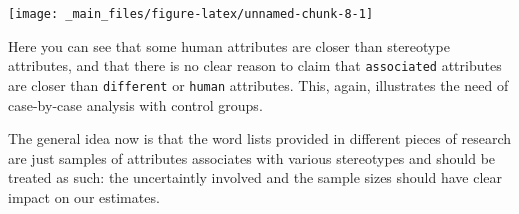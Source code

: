 \documentclass[12pt,]{book}
\newenvironment{Shaded}{\begin{snugshade}}{\end{snugshade}}
\newcommand{\KeywordTok}[1]{\textcolor[rgb]{0.13,0.29,0.53}{\textbf{#1}}}
\newcommand{\DecValTok}[1]{\textcolor[rgb]{0.00,0.00,0.81}{#1}}
\newcommand{\StringTok}[1]{\textcolor[rgb]{0.31,0.60,0.02}{#1}}
\newcommand{\CommentTok}[1]{\textcolor[rgb]{0.56,0.35,0.01}{\textit{#1}}}
\newcommand{\OperatorTok}[1]{\textcolor[rgb]{0.81,0.36,0.00}{\textbf{#1}}}
\newcommand{\NormalTok}[1]{#1}
\begin{document}
\vspace{1mm} \footnotesize

\begin{Shaded}
\end{Shaded}

\begin{center}\texttt{[image: \_main\_files/figure-latex/unnamed-chunk-8-1]} \end{center}

\normalsize

\noindent Here you can see that some human attributes are closer than
stereotype attributes, and that there is no clear reason to claim that
\texttt{associated} attributes are closer than \texttt{different} or
\texttt{human} attributes. This, again, illustrates the need of
case-by-case analysis with control groups.

The general idea now is that the word lists provided in different pieces
of research are just samples of attributes associates with various
stereotypes and should be treated as such: the uncertaintly involved and
the sample sizes should have clear impact on our estimates.
\end{document}
